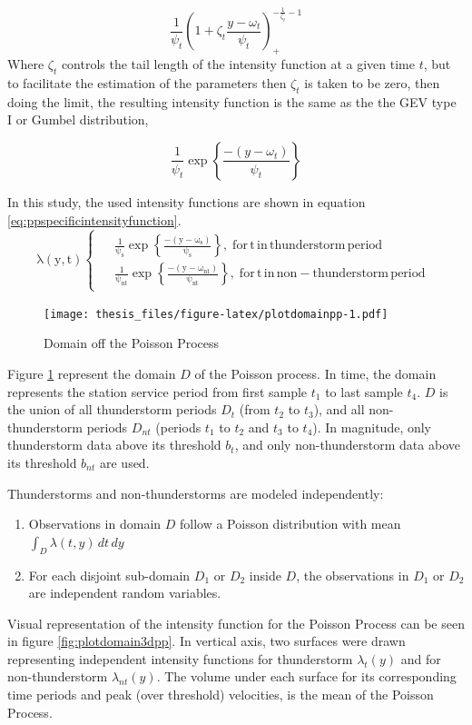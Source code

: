 \documentclass[12pt,oneside]{reedthesis}
\providecommand{\tightlist}{%
  \setlength{\itemsep}{0pt}\setlength{\parskip}{0pt}}
\begin{document}
\[
\frac{1}{\psi_t}\left(1+\zeta_t\frac{y-\omega_t}{\psi_t}\right)_+^{-\frac{1}{\zeta_t}-1}
\]
Where \(\zeta_t\) controls the tail length of the intensity function at a given time \(t\), but to facilitate the estimation of the parameters then \(\zeta_t\) is taken to be zero, then doing the limit, the resulting intensity function is the same as the the GEV type I or Gumbel distribution,

\[
\frac{1}{\psi_t}\exp\left\{\frac{-(y-\omega_t)}{\psi_t}\right\}
\]

In this study, the used intensity functions are shown in equation \eqref{eq:ppspecificintensityfunction}.
\begin{equation}
  \mathrm{
    \lambda\left(y,t\right)
    \begin{cases}
      \begin{split}
            &\frac{1}{\psi_s}\exp\left\{\frac{-(y-\omega_s)}{\psi_s}\right\},\;for\,t\,in\,thunderstorm\,period
            \\
            &\frac{1}{\psi_{nt}}\exp\left\{\frac{-(y-\omega_{nt})}{\psi_{nt}}\right\},\;for\,t\,in\,non-thunderstorm\,period      
      \end{split}
    \end{cases}
  }
  \label{eq:ppspecificintensityfunction}
\end{equation}
\footnotesize
\begin{figure}
\centering
\texttt{[image: thesis\_files/figure-latex/plotdomainpp-1.pdf]}
\caption{\label{fig:plotdomainpp}Domain off the Poisson Process}
\end{figure}
\normalsize

Figure \ref{fig:plotdomainpp} represent the domain \(D\) of the Poisson process. In time, the domain represents the station service period from first sample \(t_1\) to last sample \(t_4\). \(D\) is the union of all thunderstorm periods \(D_t\) (from \(t_2\) to \(t_3\)), and all non-thunderstorm periods \(D_{nt}\) (periods \(t_1\) to \(t_2\) and \(t_3\) to \(t_4\)). In magnitude, only thunderstorm data above its threshold \(b_t\), and only non-thunderstorm data above its threshold \(b_{nt}\) are used.

Thunderstorms and non-thunderstorms are modeled independently:
\begin{enumerate}
\def\labelenumi{\arabic{enumi}.}
\tightlist
\item
  Observations in domain \(D\) follow a Poisson distribution with mean \(\int_D\lambda(t,y)\,dt\,dy\)
\item
  For each disjoint sub-domain \(D_1\) or \(D_2\) inside \(D\), the observations in \(D_1\) or \(D_2\) are independent random variables.
\end{enumerate}
Visual representation of the intensity function for the Poisson Process can be seen in figure \ref{fig:plotdomain3dpp}. In vertical axis, two surfaces were drawn representing independent intensity functions for thunderstorm \(\lambda_t(y)\) and for non-thunderstorm \(\lambda_{nt}(y)\). The volume under each surface for its corresponding time periods and peak (over threshold) velocities, is the mean of the Poisson Process.
\end{document}
